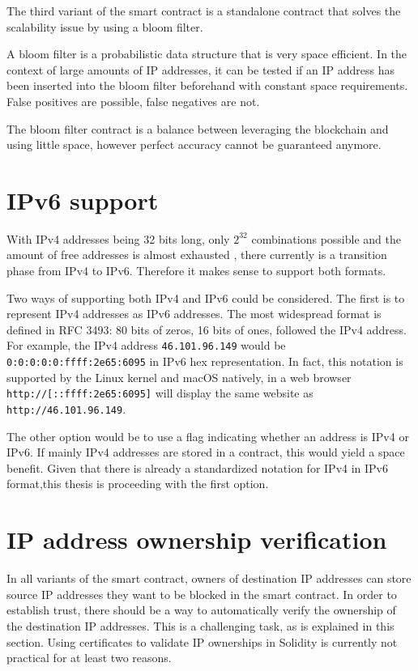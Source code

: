 The third variant of the smart contract is a standalone contract that solves the scalability issue by using a bloom filter.

A bloom filter is a probabilistic data structure that is very space efficient. In the context of large amounts of IP addresses, it can be tested if an IP address has been inserted into the bloom filter beforehand with constant space requirements. False positives are possible, false negatives are not.

The bloom filter contract is a balance between leveraging the blockchain and using little space, however perfect accuracy cannot be guaranteed anymore.

\section{IPv6 support}

With IPv4 addresses being 32 bits long, only $ 2^{32} $ combinations possible and the amount of free addresses is almost exhausted \cite{IPv4Exhaustion}, there currently is a transition phase from IPv4 to IPv6. Therefore it makes sense to support both formats.

Two ways of supporting both IPv4 and IPv6 could be considered.
The first is to represent IPv4 addresses as IPv6 addresses. The most widespread format is defined in RFC 3493: 80 bits of zeros, 16 bits of ones, followed the IPv4 address. For example, the IPv4 address \texttt{46.101.96.149} would be \texttt{0:0:0:0:0:ffff:2e65:6095} in IPv6 hex representation. In fact, this notation is supported by the Linux kernel and macOS natively, in a web browser \texttt{http://[::ffff:2e65:6095]} will display the same website as \texttt{http://46.101.96.149}.

The other option would be to use a flag indicating whether an address is IPv4 or IPv6. If mainly IPv4 addresses are stored in a contract, this would yield a space benefit.
Given that there is already a standardized notation for IPv4 in IPv6 format,this thesis is proceeding with the first option.

\section{IP address ownership verification}
In all variants of the smart contract, owners of destination IP addresses can store source IP addresses they want to be blocked in the smart contract. In order to establish trust, there should be a way to automatically verify the ownership of the destination IP addresses. This is a challenging task, as is explained in this section. Using certificates to validate IP ownerships in Solidity is currently not practical for at least two reasons.

